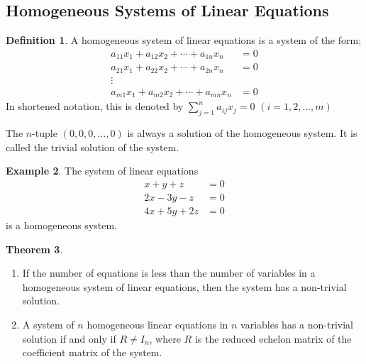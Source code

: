 \documentclass[11pt,a4paper]{article}
\theoremstyle{definition}
\newtheorem{thm}{Theorem}[subsection]
\newtheorem{defn}[thm]{Definition}
\newtheorem{exa}[thm]{Example}
\begin{document}
\subsection{Homogeneous Systems of Linear Equations}
\begin{defn}
A homogeneous system of linear equations is a system of the form;
\begin{align*}
a_{11}x_1+a_{12}x_2+\cdots+a_{1n}x_n &=0\\
a_{21}x_1+a_{22}x_2+\cdots+a_{2n}x_n &=0\\
\vdots\\
a_{m1}x_1+a_{m2}x_2+\cdots+a_{mn}x_n &=0
\end{align*}
In shortened notation, this is denoted by $\sum\limits^n_{j=1}a_{ij}x_j=0$ $(i=1,2,\dots, m)$

The $n$-tuple $(0,0,0,\dots,0)$ is always a solution of the homogeneous system. It is called the trivial solution of the system.
\end{defn}

\begin{exa}
The system of linear equations
\begin{align*}
x+y+z &=0\\
2x-3y-z&=0\\
4x+5y+2z &=0
\end{align*}
is a homogeneous system.
\end{exa}

\begin{thm}\label{thm:homogeneous}
\begin{enumerate}
\item If the number of equations is less than the number of variables in a
homogeneous system of linear equations, then the system has a non-trivial
solution.
\item A system of $n$ homogeneous linear equations in $n$ variables has a
non-trivial solution if and only if $R\neq I_n$, where $R$ is the reduced
echelon matrix of the coefficient matrix of the system.
\end{enumerate}
\end{thm}
\end{document}
